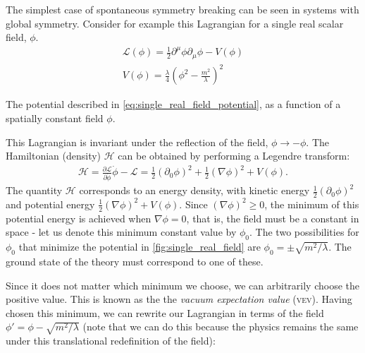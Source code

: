 The simplest case of spontaneous symmetry breaking can be seen in systems with global symmetry. Consider for example this Lagrangian for a single real scalar field, $\phi$.
\begin{align}
\mathcal{L}(\phi) = \frac{1}{2}\partial^\mu\phi\partial_\mu\phi - V(\phi)\\
V(\phi) = \frac{\lambda}{4}\left(\phi^2 - \frac{m^2}{\lambda}\right)^2
\label{eq:single_real_field_potential}
\end{align}

\begin{marginfigure}
\caption{The potential described in \eqref{eq:single_real_field_potential}, as a function of a spatially constant field $\phi$.}
\label{fig:single_real_field}
\end{marginfigure}
This Lagrangian is invariant under the reflection of the field, $\phi\rightarrow -\phi$. The Hamiltonian (density) $\mathcal{H}$ can be obtained by performing a Legendre transform:
\begin{align}
\mathcal{H} = \frac{\partial\mathcal{L}}{\partial\dot{\phi}}\dot{\phi} - \mathcal{L} = \frac{1}{2}(\partial_0\phi)^2+ \frac{1}{2}(\nabla\phi)^2+ V(\phi).
\end{align}
The quantity $\mathcal{H}$ corresponds to an energy density, with kinetic energy $\frac{1}{2}(\partial_0\phi)^2$ and potential energy $\frac{1}{2}(\nabla\phi)^2 + V(\phi)$. Since $(\nabla\phi)^2 \geq 0$, the minimum of this potential energy is achieved when $\nabla\phi = 0$, that is, the field must be a constant in space - let us denote this minimum constant value by $\phi_0$. The two possibilities for $\phi_0$ that minimize the potential in \autoref{fig:single_real_field} are $\phi_0 = \pm\sqrt{m^2/\lambda}$. The ground state of the theory must correspond to one of these.

Since it does not matter which minimum we choose, we can arbitrarily choose the positive value. This is known as the the \emph{vacuum expectation value} (\textsc{vev}). Having chosen this minimum, we can rewrite our Lagrangian in terms of the field $\phi' = \phi - \sqrt{m^2/\lambda}$ (note that we can do this because the physics remains the same under this translational redefinition of the field):

